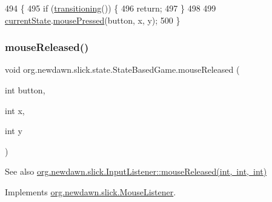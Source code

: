 \begin{DoxyCode}
494                                                        \{
495         \textcolor{keywordflow}{if} (\mbox{\hyperlink{classorg_1_1newdawn_1_1slick_1_1state_1_1_state_based_game_ae869c08778875776081935a090d4c92f}{transitioning}}()) \{
496             \textcolor{keywordflow}{return};
497         \}
498         
499         \mbox{\hyperlink{classorg_1_1newdawn_1_1slick_1_1state_1_1_state_based_game_a6a45e68094bb9b7ec30b8a8b7d415766}{currentState}}.\mbox{\hyperlink{interfaceorg_1_1newdawn_1_1slick_1_1_mouse_listener_aeca4c21a38aa31c408f3daf6f86c0925}{mousePressed}}(button, x, y);
500     \}
\end{DoxyCode}
\mbox{\label{classorg_1_1newdawn_1_1slick_1_1state_1_1_state_based_game_a46e077bbb1c01efe0c24513a6e759df8}} 
\subsubsection{\texorpdfstring{mouse\+Released()}{mouseReleased()}}
{\footnotesize\ttfamily void org.\+newdawn.\+slick.\+state.\+State\+Based\+Game.\+mouse\+Released (\begin{DoxyParamCaption}\item[{int}]{button,  }\item[{int}]{x,  }\item[{int}]{y }\end{DoxyParamCaption})\hspace{0.3cm}{\ttfamily [inline]}}

\begin{DoxySeeAlso}{See also}
\mbox{\hyperlink{interfaceorg_1_1newdawn_1_1slick_1_1_mouse_listener_a8d1606869f610664f9299565067d5571}{org.\+newdawn.\+slick.\+Input\+Listener\+::mouse\+Released(int, int, int)}} 
\end{DoxySeeAlso}


Implements \mbox{\hyperlink{interfaceorg_1_1newdawn_1_1slick_1_1_mouse_listener_a8d1606869f610664f9299565067d5571}{org.\+newdawn.\+slick.\+Mouse\+Listener}}.


